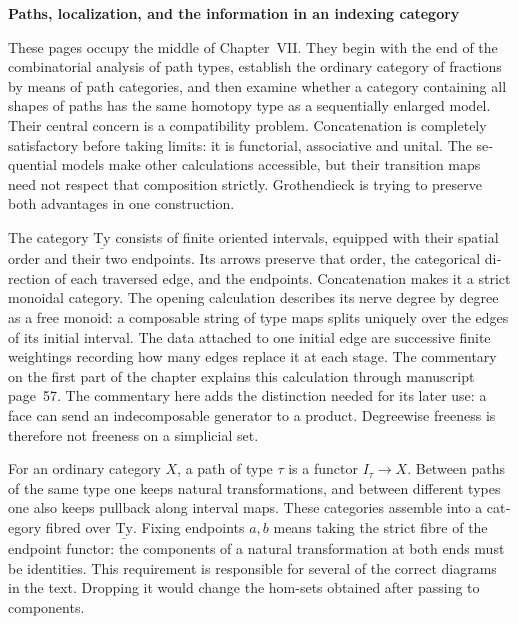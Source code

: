 \begin{otherlanguage}{english}
\noindent\textbf{Paths, localization, and the information in an indexing category}



\medskip
These pages occupy the middle of Chapter~VII.  They begin with the end of the combinatorial analysis of path types, establish the ordinary category of fractions by means of path categories, and then examine whether a category containing all shapes of paths has the same homotopy type as a sequentially enlarged model.  Their central concern is a compatibility problem.  Concatenation is completely satisfactory before taking limits: it is functorial, associative and unital.  The sequential models make other calculations accessible, but their transition maps need not respect that composition strictly.  Grothendieck is trying to preserve both advantages in one construction.

The category $\underline{\mathrm{Ty}}$ consists of finite oriented intervals, equipped with their spatial order and their two endpoints.  Its arrows preserve that order, the categorical direction of each traversed edge, and the endpoints.  Concatenation makes it a strict monoidal category.  The opening calculation describes its nerve degree by degree as a free monoid: a composable string of type maps splits uniquely over the edges of its initial interval.  The data attached to one initial edge are successive finite weightings recording how many edges replace it at each stage.  The commentary on the first part of the chapter explains this calculation through manuscript page~57.  The commentary here adds the distinction needed for its later use: a face can send an indecomposable generator to a product.  Degreewise freeness is therefore not freeness on a simplicial set.

For an ordinary category $X$, a path of type $\tau$ is a functor $I_\tau\to X$.  Between paths of the same type one keeps natural transformations, and between different types one also keeps pullback along interval maps.  These categories assemble into a category fibred over $\underline{\mathrm{Ty}}$.  Fixing endpoints $a,b$ means taking the strict fibre of the endpoint functor: the components of a natural transformation at both ends must be identities.  This requirement is responsible for several of the correct diagrams in the text.  Dropping it would change the hom-sets obtained after passing to components.


\end{otherlanguage}

